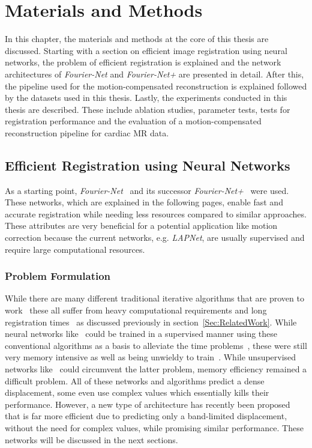 
\chapter{Materials and Methods} \label{Ch:MasterialsAndMethods}
In this chapter, the materials and methods at the core of this thesis are discussed. Starting with a section on efficient image registration using neural networks, the problem of efficient registration is explained and the network architectures of \emph{Fourier-Net} and \emph{Fourier-Net+} are presented in detail. After this, the pipeline used for the motion-compensated reconstruction is explained followed by the datasets used in this thesis. Lastly, the experiments conducted in this thesis are described. These include ablation studies, parameter tests, tests for registration performance and the evaluation of a motion-compensated reconstruction pipeline for cardiac MR data.

\section{Efficient Registration using Neural Networks} \label{Sec:NetworkArchitecture}
As a starting point, \emph{Fourier-Net}~\cite{Fourier-Net} and its successor \emph{Fourier-Net+}~\cite{Fourier-Net+} were used. These networks, which are explained in the following pages, enable fast and accurate registration while needing less resources compared to similar approaches. These attributes are very beneficial for a potential application like motion correction because the current networks, e.g. \emph{LAPNet}, are usually supervised and require large computational resources.

\subsection{Problem Formulation} \label{SubSec:ProblemFormulation}
While there are many different traditional iterative algorithms that are proven to work~\cite{DARTEL,Vercauteren2009,NiftiReg,LAP,FLASH} these all suffer from heavy computational requirements and long registration times~\cite{Chen2023} as discussed previously in section~\ref{Sec:RelatedWork}. While neural networks like~\cite{LAPNet,DeepFlash} could be trained in a supervised manner using these conventional algorithms as a basis to alleviate the time problems~\cite{Chen2020}, these were still very memory intensive as well as being unwieldy to train~\cite{Zou2022}. While unsupervised networks like~\cite{Voxelmorph,IC-Net,SYM-Net} could circumvent the latter problem, memory efficiency remained a difficult problem. All of these networks and algorithms predict a dense displacement, some even use complex values which essentially kills their performance. However, a new type of architecture has recently been proposed~\cite{Fourier-Net,Fourier-Net+} that is far more efficient due to predicting only a band-limited displacement, without the need for complex values, while promising similar performance. These networks will be discussed in the next sections.

